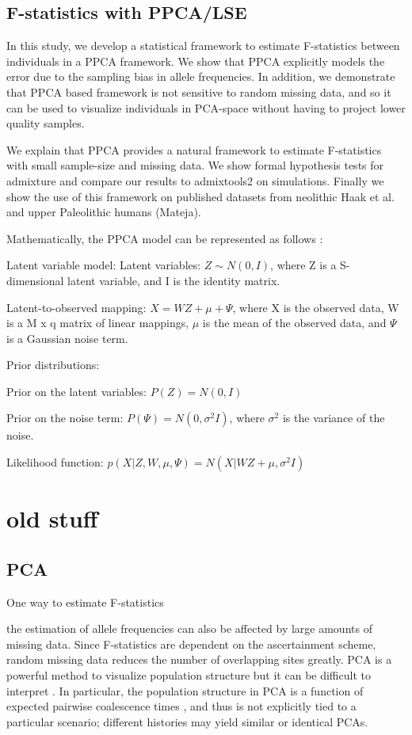 \documentclass[12pt, letterpaper]{article}
\begin{document}
\subsection{F-statistics with PPCA/LSE}
In this study, we develop a statistical framework to estimate F-statistics between individuals in a PPCA framework. We show that PPCA explicitly models the error due to the sampling bias in allele frequencies. In addition, we demonstrate that PPCA based framework is not sensitive to random missing data, and so it can be used to visualize individuals in PCA-space without having to project lower quality samples.

We explain that PPCA provides a natural framework to estimate F-statistics with small sample-size and missing data. We show formal hypothesis tests for admixture and compare our results to admixtools2 \cite{maier_limits_2022} on simulations. Finally we show the use of this framework on published datasets from neolithic Haak et al. and upper Paleolithic humans (Mateja). 

Mathematically, the PPCA model can be represented as follows \cite{tipping_probabilistic_nodate}:

Latent variable model:
Latent variables: $Z \sim N(0, I)$, where Z is a S-dimensional latent variable, and I is the identity matrix.

Latent-to-observed mapping: $X = WZ + \mu + \Psi$, where X is the observed data, W is a M x q matrix of linear mappings, $\mu$ is the mean of the observed data, and $\Psi$ is a Gaussian noise term.

Prior distributions:

Prior on the latent variables: $P(Z) = N(0, I)$

Prior on the noise term: $P(\Psi) = N(0, \sigma^2I)$, where $\sigma^2$ is the variance of the noise.

Likelihood function:
$p(X|Z, W, \mu, \Psi) = N(X|WZ + \mu, \sigma^2I)$

\section{old stuff}
\subsection{PCA}

One way to estimate F-statistics 

the estimation of allele frequencies can also be affected by large amounts of missing data. Since F-statistics are dependent on the ascertainment scheme, random missing data reduces the number of overlapping sites greatly.
PCA is a powerful method to visualize population structure but it can be difficult to interpret \citep{cavalli-sforza1993, novembre_stephens_2008, degiorgio_rosenberg2013}. In particular, the population structure in PCA is a function of expected pairwise coalescence times \citep{mcvean_genealogical_2009}, and thus is not explicitly tied to a particular scenario; different histories may yield similar or identical PCAs. 
\end{document}
